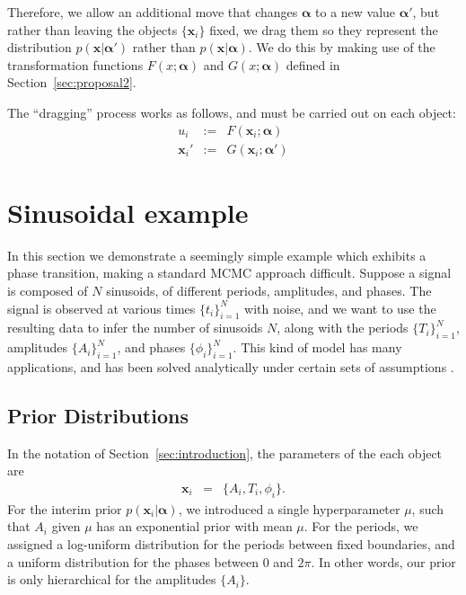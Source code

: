 \documentclass[letterpaper, 11pt]{article}
\newcommand{\hyperparams}{\boldsymbol{\alpha}}
\newcommand{\xx}{\mathbf{x}}
\begin{document}
Therefore, we allow an additional move that changes $\hyperparams$ to a new
value $\hyperparams'$, but rather than leaving the objects $\{\xx_i\}$ fixed, we
drag them so they represent the distribution $p(\xx | \hyperparams')$ rather than
$p(\xx|\hyperparams)$. We do this by making use of the transformation functions
$F(x; \hyperparams)$ and $G(x; \hyperparams)$ defined in Section~\ref{sec:proposal2}.

The ``dragging'' process works as follows, and must be carried out on
each object:
\begin{eqnarray}
u_i &:=& F(\xx_i; \hyperparams)\\
\xx_i' &:=& G(\xx_i; \hyperparams')
\end{eqnarray}

\section{Sinusoidal example}
In this section we demonstrate a seemingly simple example which exhibits
a phase transition, making a standard MCMC approach difficult. Suppose
a signal is composed of $N$ sinusoids, of different periods, amplitudes,
and phases. The signal is observed at various times $\{t_i\}_{i=1}^N$ with
noise, and we want to use the resulting data to infer the number of sinusoids
$N$, along with the periods $\{T_i\}_{i=1}^N$, amplitudes $\{A_i\}_{i=1}^N$,
and phases $\{\phi_i\}_{i=1}^N$.
This kind of model has many applications, and has been solved analytically
under certain sets of assumptions \citep[see e.g.][]{bretthorst}.

\subsection{Prior Distributions}
In the notation of Section~\ref{sec:introduction}, the parameters of the
each object are
\begin{eqnarray}
\xx_i &=& \{A_i, T_i, \phi_i\}.
\end{eqnarray}
For the interim prior $p(\xx_i | \hyperparams)$, we introduced a single
hyperparameter $\mu$, such that $A_i$ given $\mu$ has an exponential prior
with mean $\mu$. For the periods, we assigned a log-uniform distribution for
the periods between fixed boundaries, and a uniform distribution for the phases
between 0 and $2\pi$. In other words, our prior is only hierarchical for the
amplitudes $\{A_i\}$.
\end{document}

